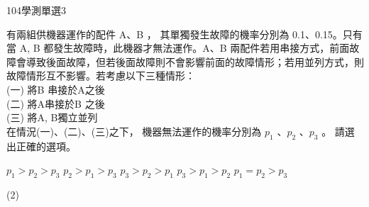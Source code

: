     \begin{QUESTION}
        \begin{ExamInfo}{104}{學測}{單選}{3}
        \end{ExamInfo}
        \begin{ExamAnsRateInfo}{57}{78}{60}{33}
        \end{ExamAnsRateInfo}
        \begin{QBODY}
            有兩組供機器運作的配件 A、B ， 其單獨發生故障的機率分別為 0.1、0.15。只有當 A, B 都發生故障時，此機器才無法運作。A、B 兩配件若用串接方式，前面故障會導致後面故障，但若後面故障則不會影響前面的故障情形；若用並列方式，則故障情形互不影響。若考慮以下三種情形：\\
			(一) 將B 串接於A之後\\
			(二) 將A串接於B 之後\\
			(三) 將A, B獨立並列\\
			在情況(一)、(二)、(三)之下， 機器無法運作的機率分別為 ${{p}_{1}}$ 、${{p}_{2}}$ 、${{p}_{3}}$ 。
			請選出正確的選項。
			\begin{QOPS}
				\QOP ${{p}_{1}}>{{p}_{2}}>{{p}_{3}}$
				\QOP ${{p}_{2}}>{{p}_{1}}>{{p}_{3}}$
				\QOP ${{p}_{3}}>{{p}_{2}}>{{p}_{1}}$
				\QOP ${{p}_{3}}>{{p}_{1}}>{{p}_{2}}$
				\QOP ${{p}_{1}}={{p}_{2}}>{{p}_{3}}$
			\end{QOPS}
        \end{QBODY}
        \begin{QFROMS}
        \end{QFROMS}
        \begin{QTAGS}\end{QTAGS}
        \begin{QANS}
            (2)
        \end{QANS}
        \begin{QSOLLIST}
        \end{QSOLLIST}
        \begin{QEMPTYSPACE}
        \end{QEMPTYSPACE}
    \end{QUESTION}
